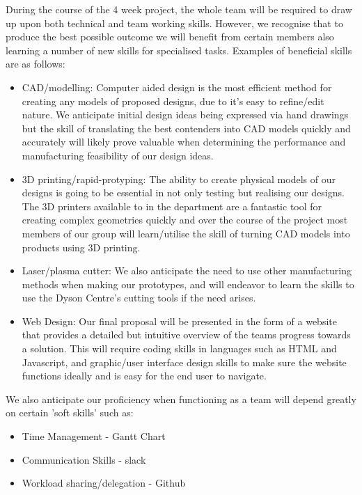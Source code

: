 \documentclass[12pt]{article}
\def\n{\noindent}
\begin{document}
During the course of the 4 week project, the whole team will be required to draw up upon both technical and team working skills. However, we recognise that to produce the best possible outcome we will benefit from certain members also learning a number of new skills for specialised tasks. Examples of beneficial skills are as follows:  

\begin{itemize}
\item CAD/modelling: Computer aided design is the most efficient method for creating any models of proposed designs, due to it's easy to refine/edit nature. We anticipate initial design ideas being expressed via hand drawings but the skill of translating the best contenders into CAD models quickly and accurately will likely prove valuable when determining the performance and manufacturing feasibility of our design ideas. 
\item 3D printing/rapid-protyping: The ability to create physical models of our designs is going to be essential in not only testing but realising our designs. The 3D printers available to in the department are a fantastic tool for creating complex geometries quickly and over the course of the project most members of our group will learn/utilise the skill of turning CAD models into products using 3D printing. 
\item Laser/plasma cutter: We also anticipate the need to use other manufacturing methods when making our prototypes, and will endeavor to learn the skills to use the Dyson Centre's cutting tools if the need arises. 
\item Web Design: Our final proposal will be presented in the form of a website that provides a detailed but intuitive overview of the teams progress towards a solution. This will require coding skills in languages such as HTML and Javascript, and graphic/user interface design skills to make sure the website functions ideally and is easy for the end user to navigate.  
\end{itemize}
 
\n We also anticipate our proficiency when functioning as a team will depend greatly on certain 'soft skills' such as: 

\begin{itemize}
\item Time Management - Gantt Chart 
\item Communication Skills - slack 
\item Workload sharing/delegation - Github 
\end{itemize}
\end{document}
